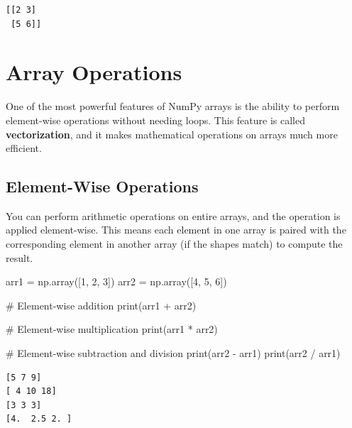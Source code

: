 \documentclass[
  letterpaper,
  DIV=11,
  numbers=noendperiod]{scrreprt}
\newenvironment{Shaded}{\begin{snugshade}}{\end{snugshade}}
\newcommand{\BuiltInTok}[1]{\textcolor[rgb]{0.00,0.23,0.31}{#1}}
\newcommand{\CommentTok}[1]{\textcolor[rgb]{0.37,0.37,0.37}{#1}}
\newcommand{\DecValTok}[1]{\textcolor[rgb]{0.68,0.00,0.00}{#1}}
\newcommand{\NormalTok}[1]{\textcolor[rgb]{0.00,0.23,0.31}{#1}}
\newcommand{\OperatorTok}[1]{\textcolor[rgb]{0.37,0.37,0.37}{#1}}
\begin{document}
\begin{verbatim}
[[2 3]
 [5 6]]
\end{verbatim}

\hypertarget{array-operations}{%
\section{Array Operations}\label{array-operations}}

One of the most powerful features of NumPy arrays is the ability to
perform element-wise operations without needing loops. This feature is
called \textbf{vectorization}, and it makes mathematical operations on
arrays much more efficient.

\hypertarget{element-wise-operations}{%
\subsection{Element-Wise Operations}\label{element-wise-operations}}

You can perform arithmetic operations on entire arrays, and the
operation is applied element-wise. This means each element in one array
is paired with the corresponding element in another array (if the shapes
match) to compute the result.

\begin{Shaded}
\begin{Highlighting}[]
\NormalTok{arr1 }\OperatorTok{=}\NormalTok{ np.array([}\DecValTok{1}\NormalTok{, }\DecValTok{2}\NormalTok{, }\DecValTok{3}\NormalTok{])}
\NormalTok{arr2 }\OperatorTok{=}\NormalTok{ np.array([}\DecValTok{4}\NormalTok{, }\DecValTok{5}\NormalTok{, }\DecValTok{6}\NormalTok{])}

\CommentTok{\# Element{-}wise addition}
\BuiltInTok{print}\NormalTok{(arr1 }\OperatorTok{+}\NormalTok{ arr2)  }

\CommentTok{\# Element{-}wise multiplication}
\BuiltInTok{print}\NormalTok{(arr1 }\OperatorTok{*}\NormalTok{ arr2)  }

\CommentTok{\# Element{-}wise subtraction and division}
\BuiltInTok{print}\NormalTok{(arr2 }\OperatorTok{{-}}\NormalTok{ arr1)  }
\BuiltInTok{print}\NormalTok{(arr2 }\OperatorTok{/}\NormalTok{ arr1)  }
\end{Highlighting}
\end{Shaded}

\begin{verbatim}
[5 7 9]
[ 4 10 18]
[3 3 3]
[4.  2.5 2. ]
\end{verbatim}
\end{document}
